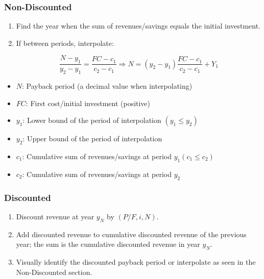 \subsubsection{Non-Discounted}
    \begin{definition}
        \begin{enumerate}
            \item Find the year when the sum of revenues/savings equals the initial investment.
            \item If between periods, interpolate:
            
            \begin{equation}
                \frac{N - y_1}{y_2 - y_1} = \frac{FC - c_1}{c_2 - c_1} \Rightarrow N = (y_2 - y_1) \frac{FC - c_1}{c_2 - c_1} + Y_1
            \end{equation}
        \end{enumerate}

        \begin{itemize}
            \item $N$: Payback period (a decimal value when interpolating)
            \item $FC$: First cost/initial investment (positive)
            \item $y_1$: Lower bound of the period of interpolation $(y_1 \leq y_2)$
            \item $y_2$: Upper bound of the period of interpolation
            \item $c_1$: Cumulative sum of revenues/savings at period $y_1 (c_1 \leq c_2)$
            \item $c_2$: Cumulative sum of revenues/savings at period $y_2$
        \end{itemize}
    \end{definition}

\subsubsection{Discounted}
    \begin{definition}
        \begin{enumerate}
            \item Discount revenue at year $y_N$ by $(P/F, i, N)$.
            \item Add discounted revenue to cumulative discounted revenue of the previous year; the sum is the cumulative discounted revenue in year $y_N$.
            \item Visually identify the discounted payback period or interpolate as seen in the Non-Discounted section.
        \end{enumerate}
    \end{definition}


